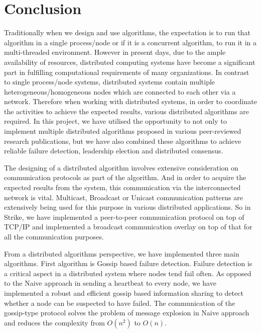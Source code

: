 \documentclass[dareport.tex]{subfiles}
\begin{document}
\section{Conclusion}

Traditionally when we design and use algorithms, the expectation is to run that algorithm in a single process/node or if it is a concurrent algorithm, to run it in a multi-threaded environment. However in present days, due to the ample availability of resources, distributed computing systems have become a significant part in fulfilling computational requirements of many organizations. In contrast to single process/node systems, distributed systems contain multiple heterogeneous/homogeneous nodes which are connected to each other via a network. Therefore when working with distributed systems, in order to coordinate the activities to achieve the expected results, various distributed algorithms are required. 
In this project, we have utilised the opportunity to not only to implement multiple distributed algorithms proposed in various peer-reviewed research publications, but we have also combined these algorithms to achieve reliable failure detection, leadership election and distributed consensus.

The designing of a distributed algorithm involves extensive consideration on communication protocols as part of the algorithm. And in order to acquire the expected results from the system, this communication via the interconnected network is vital. Multicast, Broadcast or Unicast communication patterns are extensively being used for this purpose in various distributed applications. So in Strike, we have implemented a peer-to-peer communication protocol on top of TCP/IP and implemented a broadcast communication overlay on top of that for all the communication purposes.

From a distributed algorithms perspective, we have implemented three main algorithms. First algorithm is Gossip based failure detection. Failure detection is a critical aspect in a distributed system where nodes tend fail often. As opposed to the Naive approach in sending a heartbeat to every node, we have implemented a robust and efficient gossip based information sharing to detect whether a node can be suspected to have failed. The communication of the gossip-type protocol solves the problem of message explosion in Naive approach and reduces the complexity from $ O(n^2) $ to $ O(n) $.
\end{document}
